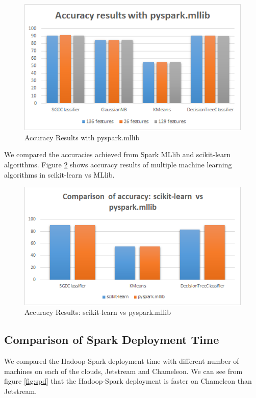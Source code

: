 \documentclass[9pt,twocolumn,twoside]{../../styles/osajnl}
\begin{document}
\begin{figure}[h]
\centering
\includegraphics[width=\linewidth,scale=1]{images/accmllib}
\caption{Accuracy Results with pyspark.mllib}
\label{fig:accmllib}
\end{figure}

We compared the accuracies achieved from Spark MLlib and scikit-learn algorithms. Figure \ref{fig:mllibvssklearn} shows accuracy results of multiple machine learning algorithms in scikit-learn vs MLlib.

\begin{figure}[h]
\centering
\includegraphics[width=\linewidth,scale=1]{images/mllibvssklearn}
\caption{Accuracy Results: scikit-learn vs pyspark.mllib}
\label{fig:mllibvssklearn}
\end{figure}


\subsection{Comparison of Spark Deployment Time}

We compared the Hadoop-Spark deployment time with different number of machines on each of the clouds, Jetstream and Chameleon. We can see from figure \ref{fig:spd} that the Hadoop-Spark deployment is faster on Chameleon than  Jetstream. 
\end{document}
